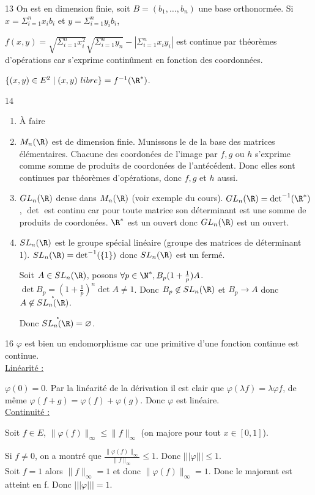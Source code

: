 \begin{correction}{13}
    On est en dimension finie, soit $B = (b_1, \dots, b_n)$ une base orthonormée.
    Si $x = \Sigma_{i = 1}^n x_ib_i$ et $y = \Sigma_{i = 1}^n y_ib_i$,

    $f(x,y) = \sqrt{\Sigma_{i = 1}^n x_i^2}\sqrt{\Sigma_{i = 1}^n y_n} - | \Sigma_{i=1}^n x_iy_i|$ est continue par théorèmes d'opérations car s'exprime continûment en fonction des coordonnées.  

    $\{(x,y) \in E^2 \mid (x,y)~libre\} = f^{-1}(\R^{*})$.
\end{correction}
\begin{correction}{14}
\begin{enumerate}
    \item À faire
    \item $M_n(\R)$ est de dimension finie. Munissons le de la base des matrices élémentaires. Chacune des coordonées de l'image par $f,g$ ou $h$ s'exprime comme somme de produits de coordonées de l'antécédent. Donc elles sont continues par théorèmes d'opérations, donc $f,g$ et $h$ aussi.
    \item $GL_n(\R)$ dense dans $M_n(\R)$ (voir exemple du cours). $GL_n(\R) = \det^{-1}(\R^{*})$, $\det$ est continu car pour toute matrice son déterminant est une somme de produits de coordonées.
    $\R^{*}$ est un ouvert donc $GL_n(\R)$ est un ouvert.
    \item $SL_n(\R)$ est le groupe spécial linéaire (groupe des matrices de déterminant 1). $SL_n(\R) = \det^{-1} (\{1\})$ donc $SL_n(\R)$ est un fermé.

    Soit $A \in SL_n(\R)$, posons $\forall p \in \N^{*}, B_p (1 + \frac 1 p) A$.
    $\det B_p = (1 + \frac 1 p)^n \det A \not \equal 1$. Donc $B_p \not \in SL_n(\R)$ et $B_p \to A$ donc $A \not \in \mathring{SL_n(\R)}$.

    Donc $\mathring{SL_n(\R)} = \varnothing$.
\end{enumerate}
\end{correction}

\begin{correction}{16}
$\varphi$ est bien un endomorphisme car une primitive d'une fonction continue est continue. \\

\uline{Linéarité :}

$\varphi{(0)} = 0$.
Par la linéarité de la dérivation il est clair que $\varphi (\lambda f) = \lambda \varphi f$, de même $\varphi (f + g) = \varphi{(f)} + \varphi{(g)}$. Donc $\varphi$ est linéaire. \\

\uline{Continuité :}

Soit $f \in E$, $\| \varphi{(f)}\|_{\infty} \leqslant \|f\|_{\infty}$ (on majore pour tout $x \in [0,1]$).

Si $f \not \equal 0$, on a montré que $\frac{\|\varphi{(f)}\|_{\infty}}{\|f\|_{\infty}} \leqslant 1$. Donc $|||\varphi||| \leqslant 1$. \\

Soit $f = 1$ alors $\|f\|_{\infty} = 1$ et donc $\|\varphi{(f)}\|_{\infty} = 1$.
Donc le majorant est atteint en f. Donc $|||\varphi||| = 1$.
\end{correction}

